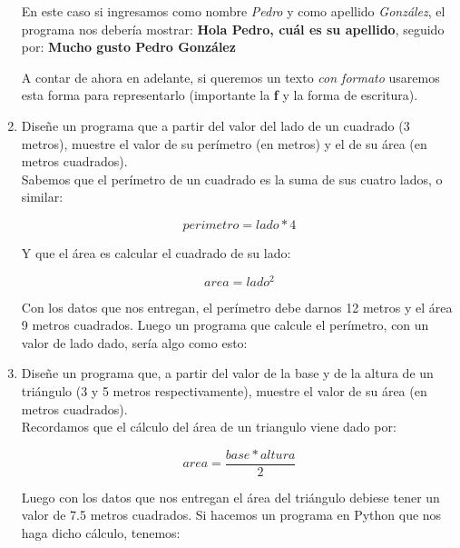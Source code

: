 \begin{enumerate}[{Ejercicio} 1.]
        \begin{listing}[H]
        \end{listing}

        En este caso si ingresamos como nombre \textit{Pedro} y como apellido \textit{González}, el programa nos debería mostrar: \textbf{Hola Pedro, cuál es su apellido}, seguido por: \textbf{Mucho gusto Pedro González}

        A contar de ahora en adelante, si queremos un texto \textit{con formato} usaremos esta forma para representarlo (importante la \textbf{f} y la forma de escritura).

        \item Diseñe un programa que a partir del valor del lado de un cuadrado (3 metros), muestre el valor de su perímetro (en metros) y el de su área (en metros cuadrados). \\
        
        \asw Sabemos que el perímetro de un cuadrado es la suma de sus cuatro lados, o similar:

        \[perimetro = lado * 4\]

        Y que el área es calcular el cuadrado de su lado:

        \[area = lado^2\]

        Con los datos que nos entregan, el perímetro debe darnos 12 metros y el área 9 metros cuadrados. Luego un programa que calcule el perímetro, con un valor de lado dado, sería algo como esto:\\


        \item Diseñe un programa que, a partir del valor de la base y de la altura de un triángulo (3 y 5 metros respectivamente), muestre el valor de su área (en metros cuadrados).\\
        
        \asw Recordamos que el cálculo del área de un triangulo viene dado por:

        \[area = \frac{base * altura}{2}\]

        Luego con los datos que nos entregan el área del triángulo debiese tener un valor de 7.5 metros cuadrados. Si hacemos un programa en Python que nos haga dicho cálculo, tenemos:\\

        

\end{enumerate}
